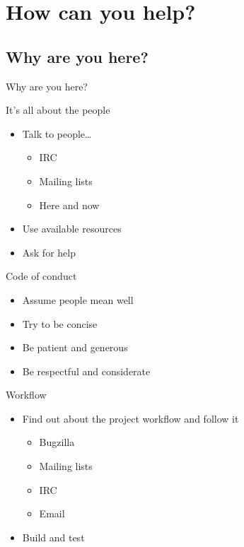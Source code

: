 \documentclass{beamer}
\begin{document}
\section{How can you help?}

\subsection{Why are you here?}

\begin{frame}{Why are you here?}%
\end{frame}

\begin{frame}{It's all about the people}
  \begin{itemize}
  \item
    Talk to people\ldots
    \begin{itemize}
    \item
      IRC
    \item
      Mailing lists
    \item
      Here and now
    \end{itemize}
  \item
    Use available resources
  \item
    Ask for help
  \end{itemize}
\end{frame}

\begin{frame}{Code of conduct}
  \begin{itemize}
  \item
    Assume people mean well
  \item
    Try to be concise
  \item
    Be patient and generous
  \item
    Be respectful and considerate
  \end{itemize}
\end{frame}

\begin{frame}{Workflow}
  \begin{itemize}
  \item
    Find out about the project workflow and follow it
    \begin{itemize}
    \item
      Bugzilla
    \item
      Mailing lists
    \item
      IRC
    \item
      Email
    \end{itemize}
  \item
    Build and test
  \end{itemize}
\end{frame}
\end{document}
